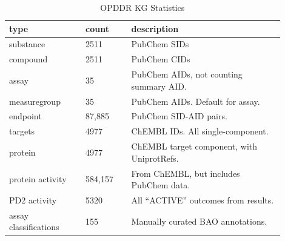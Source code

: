 \begin{table}
\caption{OPDDR KG Statistics}
\label{tab:opddr_03}
\centering
\begin{tabular}{p{0.25\linewidth}p{0.15\linewidth}p{0.5\linewidth}}
\hline
\textbf{type} & \textbf{count} & \textbf{description}\\
\hline
substance & 2511 & PubChem SIDs\\
compound & 2511 & PubChem CIDs\\
assay & 35 & PubChem AIDs, not counting summary AID.\\
measuregroup & 35 & PubChem AIDs.  Default for assay.\\
endpoint & 87,885 & PubChem SID-AID pairs.\\
targets & 4977 & ChEMBL IDs.  All single-component.\\
protein & 4977 & ChEMBL target component, with UniprotRefs.\\
protein activity & 584,157 & From ChEMBL, but includes PubChem data.\\
PD2 activity & 5320 & All “ACTIVE” outcomes from results.\\
assay classifications & 155 & Manually curated BAO annotations.\\
\hline
\end{tabular}
\end{table}

